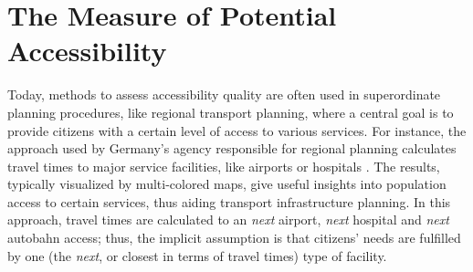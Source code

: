 \section{The Measure of Potential Accessibility}
\label{sec:potential}
Today, methods to assess accessibility quality are often used in superordinate planning procedures, like 
regional transport planning, where a central goal is to provide citizens with a certain level of access to
various services. For instance, the approach used by Germany's agency responsible for regional planning calculates
travel times to major service facilities, like airports or hospitals \citep{BBSRErreichbarkeitsmodell}. The results,
typically visualized by multi-colored maps, give useful insights 
into population access to certain services, thus aiding transport 
infrastructure planning.
In this approach, travel times are calculated to an \emph{next} airport, \emph{next} hospital and
 \emph{next} autobahn access; thus, the implicit assumption is that citizens' needs are fulfilled by
one (\ie the \emph{next}, or closest in terms of travel times) type of facility.


